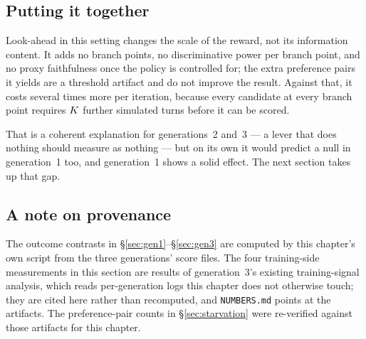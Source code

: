 \subsection{Putting it together}
Look-ahead in this setting changes the scale of the reward, not its information content. It
adds no branch points, no discriminative power per branch point, and no proxy faithfulness once
the policy is controlled for; the extra preference pairs it yields are a threshold artifact and
do not improve the result. Against that, it costs several times more per iteration, because
every candidate at every branch point requires $K$ further simulated turns before it can be
scored.

That is a coherent explanation for generations~2 and~3 --- a lever that does nothing should
measure as nothing --- but on its own it would predict a null in generation~1 too, and
generation~1 shows a solid effect. The next section takes up that gap.

\subsection{A note on provenance}
\label{sec:reproducibility-note}
The outcome contrasts in \S\ref{sec:gen1}--\S\ref{sec:gen3} are computed by this chapter's own
script from the three generations' score files. The four training-side measurements in this
section are results of generation~3's existing training-signal analysis, which reads
per-generation logs this chapter does not otherwise touch; they are cited here rather than
recomputed, and \texttt{NUMBERS.md} points at the artifacts. The preference-pair counts in
\S\ref{sec:starvation} were re-verified against those artifacts for this chapter.
